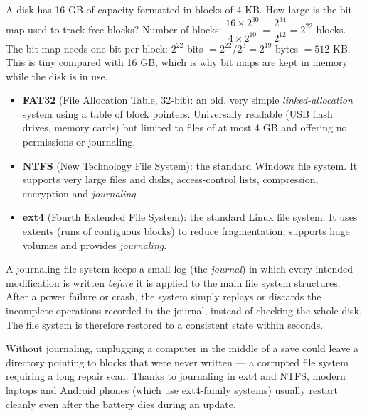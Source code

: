 \documentclass[11pt]{article}
\newcommand{\cle}[1]{{\popxbold\color{popdark}#1}}
\newcounter{popsec}
\newcounter{popsub}
\newcommand{\courssub}[1]{%
  \stepcounter{popsub}%
  \par\vspace{9pt}\noindent{\popxbold\fontsize{11.5}{13}\selectfont\color{popink}{\color{poporange}\thepopsec.\thepopsub}\hspace{6pt}#1}\par\nopagebreak\vspace{4pt}
}
\begin{document}
\begin{exoresolu}
A disk has 16 GB of capacity formatted in blocks of 4 KB. How large is the bit map used to track free blocks?
\tcblower
Number of blocks: $\dfrac{16 \times 2^{30}}{4 \times 2^{10}} = \dfrac{2^{34}}{2^{12}} = 2^{22}$ blocks.\\
The bit map needs one bit per block: $2^{22}$ bits $= 2^{22}/2^{3} = 2^{19}$ bytes $= 512$ KB.\\
This is tiny compared with 16 GB, which is why bit maps are kept in memory while the disk is in use.
\end{exoresolu}

\courssub{Common File Systems and Journaling}

\begin{itemize}
\item \textbf{FAT32} (File Allocation Table, 32-bit): an old, very simple \emph{linked-allocation} system using a table of block pointers. Universally readable (USB flash drives, memory cards) but limited to files of at most 4 GB and offering no permissions or journaling.
\item \textbf{NTFS} (New Technology File System): the standard Windows file system. It supports very large files and disks, access-control lists, compression, encryption and \emph{journaling}.
\item \textbf{ext4} (Fourth Extended File System): the standard Linux file system. It uses extents (runs of contiguous blocks) to reduce fragmentation, supports huge volumes and provides \emph{journaling}.
\end{itemize}

\begin{definition}[Journaling]
A \cle{journaling file system} keeps a small log (the \emph{journal}) in which every intended modification is written \emph{before} it is applied to the main file system structures. After a power failure or crash, the system simply replays or discards the incomplete operations recorded in the journal, instead of checking the whole disk. The file system is therefore restored to a consistent state within seconds.
\end{definition}

\begin{savaistu}
Without journaling, unplugging a computer in the middle of a save could leave a directory pointing to blocks that were never written — a corrupted file system requiring a long repair scan. Thanks to journaling in ext4 and NTFS, modern laptops and Android phones (which use ext4-family systems) usually restart cleanly even after the battery dies during an update.
\end{savaistu}
\end{document}
